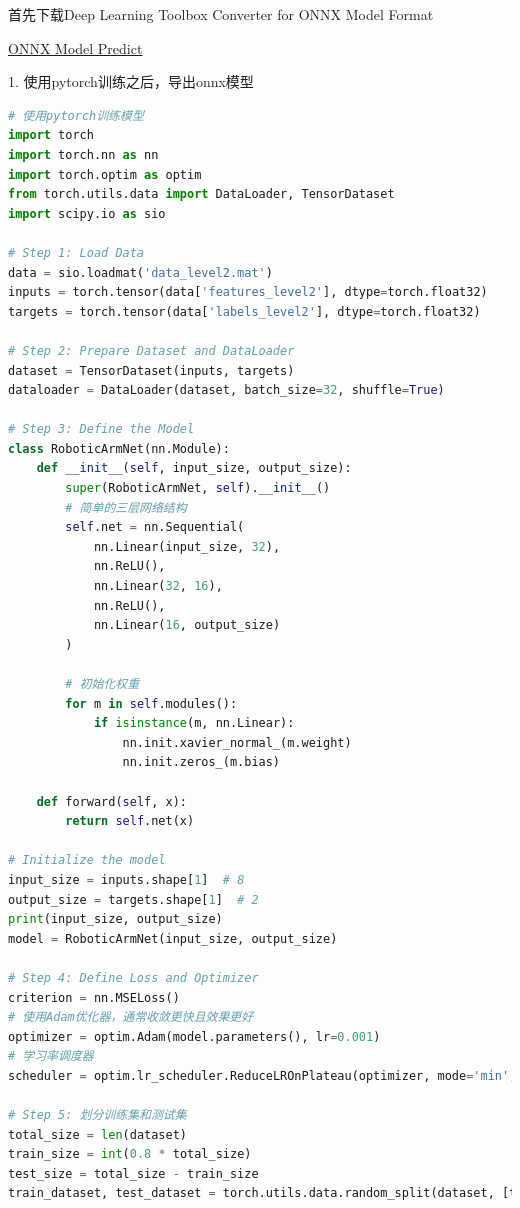 \documentclass[12pt,a4paper,UTF8]{article}
\begin{document}
首先下载Deep Learning Toolbox Converter for ONNX Model Format



\href{https://ww2.mathworks.cn/help/deeplearning/ref/onnxmodelpredict.html}{ONNX Model Predict}

1. 使用pytorch训练之后，导出onnx模型

\begin{lstlisting}[language=Python,caption=使用pytorch训练模型]
# 使用pytorch训练模型
import torch
import torch.nn as nn
import torch.optim as optim
from torch.utils.data import DataLoader, TensorDataset
import scipy.io as sio

# Step 1: Load Data
data = sio.loadmat('data_level2.mat')
inputs = torch.tensor(data['features_level2'], dtype=torch.float32)
targets = torch.tensor(data['labels_level2'], dtype=torch.float32)

# Step 2: Prepare Dataset and DataLoader
dataset = TensorDataset(inputs, targets)
dataloader = DataLoader(dataset, batch_size=32, shuffle=True)

# Step 3: Define the Model
class RoboticArmNet(nn.Module):
    def __init__(self, input_size, output_size):
        super(RoboticArmNet, self).__init__()
        # 简单的三层网络结构
        self.net = nn.Sequential(
            nn.Linear(input_size, 32),
            nn.ReLU(),
            nn.Linear(32, 16),
            nn.ReLU(),
            nn.Linear(16, output_size)
        )
        
        # 初始化权重
        for m in self.modules():
            if isinstance(m, nn.Linear):
                nn.init.xavier_normal_(m.weight)
                nn.init.zeros_(m.bias)

    def forward(self, x):
        return self.net(x)

# Initialize the model
input_size = inputs.shape[1]  # 8
output_size = targets.shape[1]  # 2
print(input_size, output_size)
model = RoboticArmNet(input_size, output_size)

# Step 4: Define Loss and Optimizer
criterion = nn.MSELoss()
# 使用Adam优化器，通常收敛更快且效果更好
optimizer = optim.Adam(model.parameters(), lr=0.001)
# 学习率调度器
scheduler = optim.lr_scheduler.ReduceLROnPlateau(optimizer, mode='min', factor=0.5, patience=5)

# Step 5: 划分训练集和测试集
total_size = len(dataset)
train_size = int(0.8 * total_size)
test_size = total_size - train_size
train_dataset, test_dataset = torch.utils.data.random_split(dataset, [train_size, test_size])


\end{lstlisting}
\end{document}
